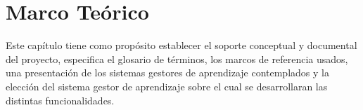 \chapter{Marco Teórico}
\label{ch:marcoTeorico}

Este capítulo tiene como propósito establecer el soporte conceptual y documental del proyecto, especifica el glosario de términos, los marcos de referencia usados, una presentación de los sistemas gestores de aprendizaje contemplados y la elección del sistema gestor de aprendizaje sobre el cual se desarrollaran las distintas funcionalidades.

\begin{comment}

\section{Acerca de la investigación}

La primer etapa de la investigación se centro en investigar acerca de qué es la \gls{gamificacion}, sus implicaciones y como debería ser implementada la busqueda permitió encontrar diversas definiciones de la gamificación, las bases sobre la cual está desarrollada y distintas recomendaciones su implementación.\\

\noindent En segunda instancia, se buscaron diversos casos de estudio y documentos de investigación que documentaran el proceso de implementación y los resultados de la investigación realizada, cada uno de los documentos encontrados nos sirve para conocer las fortalezas y áreas de oportunidad de otras implementación de gamificación.\\

\noindent Como tercer etapa, se investigaron distintos marcos de trabajo para el diseño e implementación de la gamificación, dicha busqueda obtuvo como resultado la elección de dos marcos de trabajo {\em ``Octalysis''} \cite{Octalysis} y {\em ``For The Win''} \cite{FrameWorkForTheWin} (descritos en el capítulo \nameref{ch:marcoTeorico}).\\

\noindent Posteriormente se analizaron los principales sistemas de aprendizaje en linea
buscando qué elementos de gamificación de forma nativa tenían, las restricciones de uso y
características principales. Esta etapa de investicación permitió filtrar los sistemas
que brindaban soporte a la gamificación, de forma nativa o mediante componentes externos
(plugins), de los demás sistemas de aprendizaje en línea.


\end{comment}
